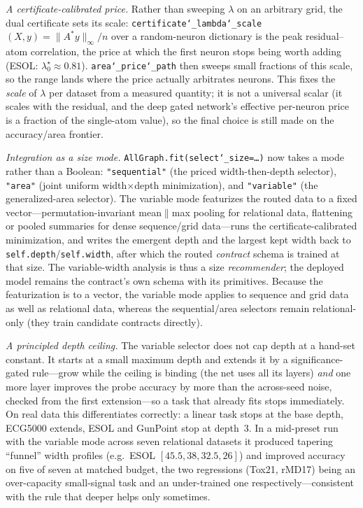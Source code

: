 \documentclass[11pt]{article}
\newcommand{\allowbreakhere}{\discretionary{}{}{}}
\newcommand{\code}[1]{\texttt{\def\_{\char`_\allowbreakhere}#1}}
\begin{document}
\emph{A certificate-calibrated price.} Rather than sweeping $\lambda$ on an arbitrary grid, the dual
certificate sets its scale: \code{certificate\_lambda\_scale}$(X,y)=\|A^\ast y\|_\infty/n$ over a random-neuron
dictionary is the peak residual--atom correlation, the price at which the first neuron stops being worth
adding (ESOL: $\lambda^\star_0\approx0.81$). \code{area\_price\_path} then sweeps small fractions of this
scale, so the range lands where the price actually arbitrates neurons. This fixes the \emph{scale} of $\lambda$
per dataset from a measured quantity; it is not a universal scalar (it scales with the residual, and the deep
gated network's effective per-neuron price is a fraction of the single-atom value), so the final choice is
still made on the accuracy/area frontier.

\emph{Integration as a size mode.} \code{AllGraph.fit(select\_size=\ldots)} now takes a mode rather than a
Boolean: \code{"sequential"} (the priced width-then-depth selector), \code{"area"} (joint uniform
width$\times$depth minimization), and \code{"variable"} (the generalized-area selector). The variable mode
featurizes the routed data to a fixed vector---permutation-invariant mean$\|$max pooling for relational data,
flattening or pooled summaries for dense sequence/grid data---runs the certificate-calibrated minimization, and
writes the emergent depth and the largest kept width back to \code{self.depth}/\code{self.width}, after which
the routed \emph{contract} schema is trained at that size. The variable-width analysis is thus a size
\emph{recommender}; the deployed model remains the contract's own schema with its primitives. Because the
featurization is to a vector, the variable mode applies to sequence and grid data as well as relational data,
whereas the sequential/area selectors remain relational-only (they train candidate contracts directly).

\emph{A principled depth ceiling.} The variable selector does not cap depth at a hand-set constant. It starts
at a small maximum depth and extends it by a significance-gated rule---grow while the ceiling is binding (the
net uses all its layers) \emph{and} one more layer improves the probe accuracy by more than the across-seed
noise, checked from the first extension---so a task that already fits stops immediately. On real data this
differentiates correctly: a linear task stops at the base depth, ECG5000 extends, ESOL and GunPoint stop at
depth~3. In a mid-preset run with the variable mode across seven relational datasets it produced tapering
``funnel'' width profiles (e.g.\ ESOL $[45.5,38,32.5,26]$) and improved accuracy on five of seven at matched
budget, the two regressions (Tox21, rMD17) being an over-capacity small-signal task and an under-trained one
respectively---consistent with the rule that deeper helps only sometimes.
\end{document}
